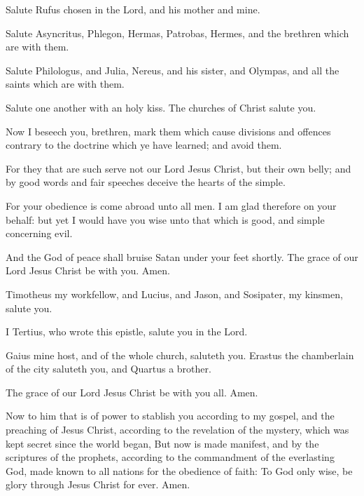 \verse Salute Rufus chosen in the Lord, and his mother and mine.

\verse Salute Asyncritus, Phlegon, Hermas, Patrobas, Hermes, and the brethren which are with them.

\verse Salute Philologus, and Julia, Nereus, and his sister, and Olympas, and all the saints which are with them.

\verse Salute one another with an holy kiss. The churches of Christ salute you.

\verse Now I beseech you, brethren, mark them which cause divisions and offences contrary to the doctrine which ye have learned; and avoid them.

\verse For they that are such serve not our Lord Jesus Christ, but their own belly; and by good words and fair speeches deceive the hearts of the simple.

\verse For your obedience is come abroad unto all men. I am glad therefore on your behalf: but yet I would have you wise unto that which is good, and simple concerning evil.

\verse And the God of peace shall bruise Satan under your feet shortly.  The grace of our Lord Jesus Christ be with you. Amen.

\verse Timotheus my workfellow, and Lucius, and Jason, and Sosipater, my kinsmen, salute you.

\verse I Tertius, who wrote this epistle, salute you in the Lord.

\verse Gaius mine host, and of the whole church, saluteth you. Erastus the chamberlain of the city saluteth you, and Quartus a brother.

\verse The grace of our Lord Jesus Christ be with you all. Amen.

\verse Now to him that is of power to stablish you according to my gospel, and the preaching of Jesus Christ, according to the revelation of the mystery, which was kept secret since the world began, \verse But now is made manifest, and by the scriptures of the prophets, according to the commandment of the everlasting God, made known to all nations for the obedience of faith: \verse To God only wise, be glory through Jesus Christ for ever. Amen.

